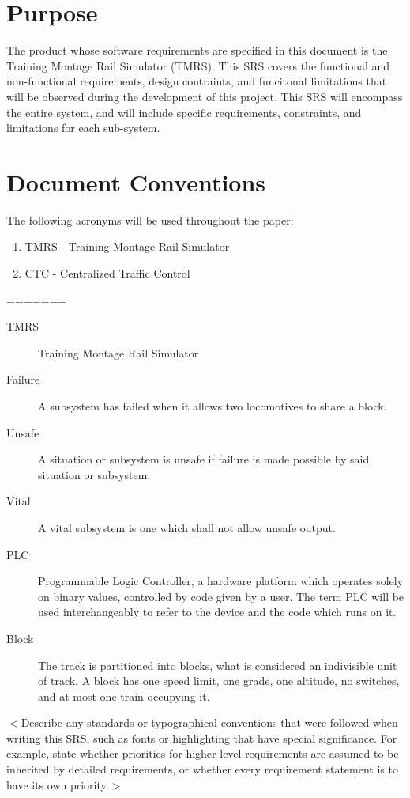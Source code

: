 \documentclass{scrreprt}
\begin{document}
\section{Purpose}
The product whose software requirements are specified in this document is the
Training Montage Rail Simulator (TMRS). This SRS covers the functional and 
non-functional requirements, design contraints, and funcitonal limitations that
will be observed during the development of this project. This SRS will encompass
the entire system, and will include specific requirements, constraints, and 
limitations for each sub-system.

\section{Document Conventions}
The following acronyms will be used throughout the paper:
\begin{enumerate}
  \item TMRS - Training Montage Rail Simulator
  \item CTC - Centralized Traffic Control
\end{enumerate}
=======
\begin{description}
  \item[TMRS] Training Montage Rail Simulator
  \item[Failure] A subsystem has failed when it allows two locomotives to share a block.
  \item[Unsafe] A situation or subsystem is unsafe if failure is made possible by said situation or subsystem.
  \item[Vital] A vital subsystem is one which shall not allow unsafe output.
  \item[PLC] Programmable Logic Controller, a hardware platform which operates solely on binary values, controlled by code given by a user. The term PLC will be used interchangeably to refer to the device and the code which runs on it.
  \item[Block] The track is partitioned into blocks, what is considered an indivisible unit of track. A block has one speed limit, one grade, one altitude, no switches, and at most one train occupying it.
\end{description}

$<$Describe any standards or typographical conventions that were followed when 
writing this SRS, such as fonts or highlighting that have special significance.  
For example, state whether priorities  for higher-level requirements are assumed 
to be inherited by detailed requirements, or whether every requirement statement 
is to have its own priority.$>$
\end{document}
